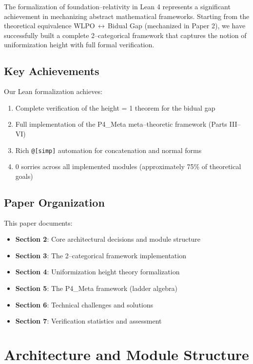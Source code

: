 \documentclass[11pt]{article}
\theoremstyle{definition}
\theoremstyle{remark}
\begin{document}
The formalization of foundation--relativity in Lean 4 represents a significant achievement in mechanizing abstract mathematical frameworks. Starting from the theoretical equivalence WLPO\,$\leftrightarrow$\,Bidual Gap (mechanized in Paper 2), we have successfully built a complete 2--categorical framework that captures the notion of uniformization height with full formal verification.

\subsection{Key Achievements}

Our Lean formalization achieves:
\begin{enumerate}
\item Complete verification of the height = 1 theorem for the bidual gap
\item Full implementation of the P4\_Meta meta--theoretic framework (Parts III--VI)
\item Rich \texttt{@[simp]} automation for concatenation and normal forms
\item 0 sorries across all implemented modules (approximately 75\% of theoretical goals)
\end{enumerate}

\subsection{Paper Organization}

This paper documents:
\begin{itemize}
\item \textbf{Section 2}: Core architectural decisions and module structure
\item \textbf{Section 3}: The 2--categorical framework implementation
\item \textbf{Section 4}: Uniformization height theory formalization
\item \textbf{Section 5}: The P4\_Meta framework (ladder algebra)
\item \textbf{Section 6}: Technical challenges and solutions
\item \textbf{Section 7}: Verification statistics and assessment
\end{itemize}

\section{Architecture and Module Structure}
\end{document}
